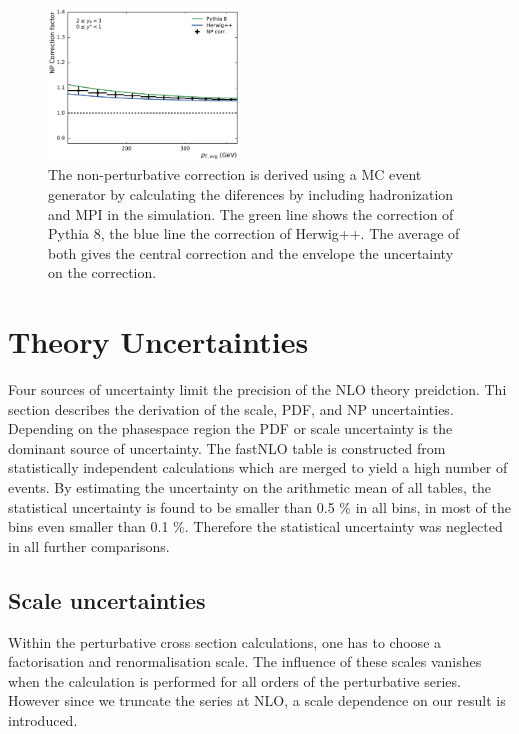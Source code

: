 \begin{figure}[htbp]
    \includegraphics[width=0.45\textwidth]{figures/theory/np_factors_calc_yb2ys0.pdf}
    \caption{The non-perturbative correction is derived using a MC event
    generator by calculating the diferences by including hadronization and MPI
    in the simulation. The green line shows the correction of Pythia 8, the blue
    line the correction of Herwig++. The average of both gives the central
correction and the envelope the uncertainty on the correction.}
    \label{fig:np_factors}
\end{figure}


\section{Theory Uncertainties}

Four sources of uncertainty limit the precision of the NLO theory preidction.
Thi section describes the derivation of the scale, PDF, \as and NP
uncertainties. Depending on the phasespace region the PDF or scale uncertainty
is the dominant source of uncertainty. The fastNLO table is
constructed from statistically independent calculations which are merged to
yield a high number of events. By estimating the uncertainty on the arithmetic
mean of all tables, the statistical uncertainty is found to be smaller than 0.5
\% in all bins, in most of the bins even smaller than 0.1 \%. Therefore the
statistical uncertainty was neglected in all further comparisons.

\subsection{Scale uncertainties}

Within the perturbative cross section calculations, one has to choose a
factorisation and renormalisation scale. The influence of these scales vanishes
when the calculation is performed for all orders of the perturbative series.
However since we truncate the series at NLO, a scale dependence on our result is
introduced. 

